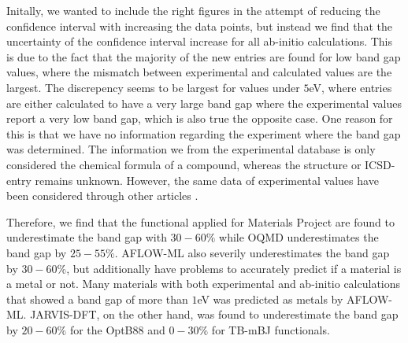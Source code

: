 Initally, we wanted to include the right figures in the attempt of reducing the confidence interval with increasing the data points, but instead we find that the uncertainty of the confidence interval increase for all ab-initio calculations. This is due to the fact that the majority of the new entries are found for low band gap values, where the mismatch between experimental and calculated values are the largest. The discrepency seems to be largest for values under $5$eV, where entries are either calculated to have a very large band gap where the experimental values report a very low band gap, which is also true the opposite case. One reason for this is that we have no information regarding the experiment where the band gap was determined. The information we from the experimental database is only considered the chemical formula of a compound, whereas the structure or ICSD-entry remains unknown. However, the same data of experimental values have been considered through other articles \cite{Ward2018, Ferrenti2020}.

Therefore, we find that the functional applied for Materials Project are found to underestimate the band gap with $30-60\%$ while OQMD underestimates the band gap by $25-55\%$. AFLOW-ML also severily underestimates the band gap by $30-60\%$, but additionally have problems to accurately predict if a material is a metal or not. Many materials with both experimental and ab-initio calculations that showed a band gap of more than $1$eV was predicted as metals by AFLOW-ML. JARVIS-DFT, on the other hand, was found to underestimate the band gap by $20-60\%$ for the OptB88 and $0-30\%$ for TB-mBJ functionals.




\clearpage
\begin{figure}[ht!]
    \centering
    \begin{subfigure}[t]{1\textwidth}
        \centering
        
        \caption{}
    \end{subfigure}%

    \begin{subfigure}[t]{1\textwidth}
        \centering
        
        \caption{}
    \end{subfigure}

    \begin{subfigure}[t]{1\textwidth}
        \centering
        
        \caption{}
    \end{subfigure}
\end{figure}

